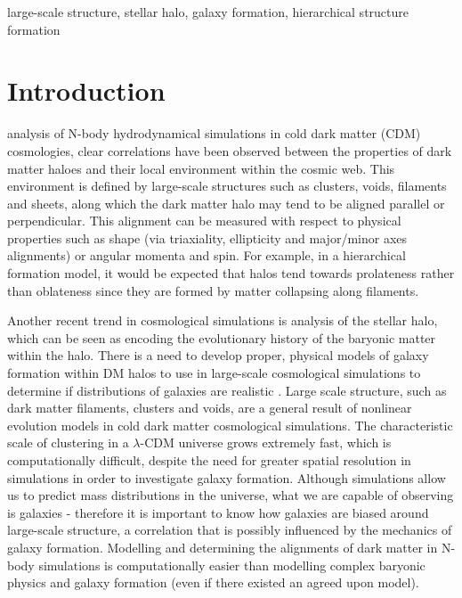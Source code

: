 \documentclass[journal]{IEEEtran}
\begin{document}
\begin{IEEEkeywords}
large-scale structure, stellar halo, galaxy formation, hierarchical structure formation
\end{IEEEkeywords}

\IEEEpeerreviewmaketitle

\section{Introduction}
 analysis of N-body hydrodynamical simulations in cold dark matter (CDM) cosmologies, clear correlations have been observed between the properties of dark matter haloes and their local environment within the cosmic web. This environment is defined by large-scale structures such as clusters, voids, filaments and sheets, along which the dark matter halo may tend to be aligned parallel or perpendicular. This alignment can be measured with respect to physical properties such as shape (via triaxiality, ellipticity and major/minor axes alignments) or angular momenta and spin. For example, in a hierarchical formation model, it would be expected that halos tend towards prolateness rather than oblateness \cite{bett07} since they are formed by matter collapsing along filaments. 

Another recent trend in cosmological simulations is analysis of the stellar halo, which can be seen as encoding the evolutionary history of the baryonic matter within the halo. There is a need to develop proper, physical models of galaxy formation within DM halos to use in large-scale cosmological simulations to determine if distributions of galaxies are realistic \cite{davis85}. Large scale structure, such as dark matter filaments, clusters and voids, are a general result of nonlinear evolution models in cold dark matter cosmological simulations. The characteristic scale of clustering in a $\lambda$-CDM universe grows extremely fast, which is computationally difficult, despite the need for greater spatial resolution in simulations in order to investigate galaxy formation. Although simulations allow us to predict mass distributions in the universe, what we are capable of observing is galaxies - therefore it is important to know how galaxies are biased around large-scale structure, a correlation that is possibly influenced by the mechanics of galaxy formation. Modelling and determining the alignments of dark matter in N-body simulations is computationally easier than modelling complex baryonic physics and galaxy formation (even if there existed an agreed upon model). 
\end{document}
